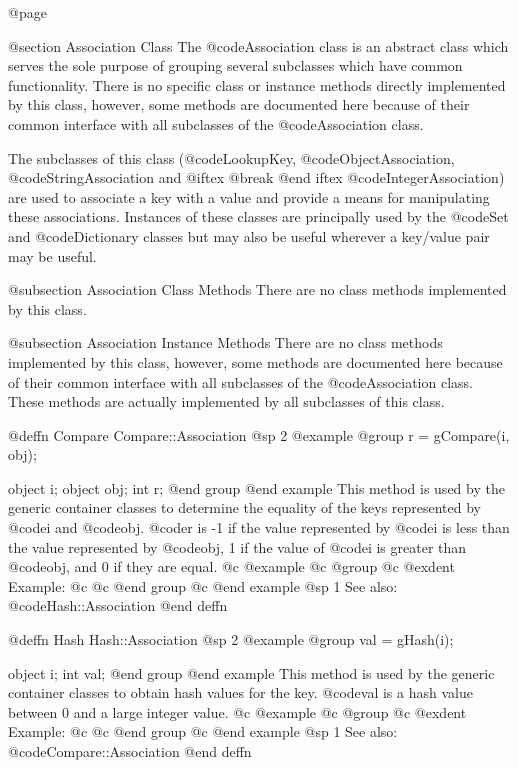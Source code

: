 @page

@section  Association Class
The @code{Association} class is an abstract class which serves the
sole purpose of grouping several subclasses which have common
functionality.  There is no specific class or instance methods
directly implemented by this class, however, some methods are documented
here because of their common interface with all subclasses of the
@code{Association} class.

The subclasses of this class (@code{LookupKey},
@code{ObjectAssociation}, @code{StringAssociation} and
@iftex 
@break 
@end iftex
@code{IntegerAssociation}) are used to associate a key with a value and
provide a means for manipulating these associations.  Instances of these
classes are principally used by the @code{Set} and @code{Dictionary}
classes but may also be useful wherever a key/value pair may be useful.


@subsection Association Class Methods
There are no class methods implemented by this class.


@subsection Association Instance Methods
There are no class methods implemented by this class, however, some
methods are documented here because of their common interface with all
subclasses of the @code{Association} class.  These methods are actually
implemented by all subclasses of this class.






@deffn {Compare} Compare::Association
@sp 2
@example
@group
r = gCompare(i, obj);

object  i;
object  obj;
int     r;
@end group
@end example
This method is used by the generic container classes to determine
the equality of the keys represented by @code{i} and @code{obj}. 
@code{r} is -1 if the value represented by @code{i} is less than
the value represented by @code{obj}, 1 if the value of @code{i}
is greater than @code{obj}, and 0 if they are equal.
@c @example
@c @group
@c @exdent Example:
@c
@c @end group
@c @end example
@sp 1
See also:  @code{Hash::Association}
@end deffn










@deffn {Hash} Hash::Association
@sp 2
@example
@group
val = gHash(i);

object  i;
int     val;
@end group
@end example
This method is used by the generic container classes to obtain hash
values for the key.  @code{val} is a hash value between 0 and a large
integer value.
@c @example
@c @group
@c @exdent Example:
@c
@c @end group
@c @end example
@sp 1
See also:  @code{Compare::Association}
@end deffn












